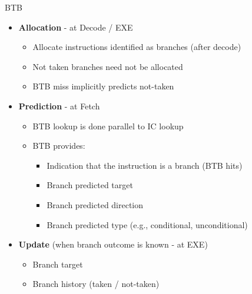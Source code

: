 \documentclass[aspectratio=169,12pt]{beamer}
\begin{document}
\begin{frame}{BTB}
    \begin{itemize}
        \item \textbf{Allocation} - at Decode / EXE
        \begin{itemize}
            \item Allocate instructions identified as branches (after decode)
            \item Not taken branches need not be allocated
            \item BTB miss implicitly predicts not-taken
        \end{itemize}
        \item \textbf{Prediction} - at Fetch
        \begin{itemize}
            \item BTB lookup is done parallel to IC lookup
            \item BTB provides:
            \begin{itemize}
                \item Indication that the instruction is a branch (BTB hits)
                \item Branch predicted target
                \item Branch predicted direction
                \item Branch predicted type (e.g., conditional, unconditional)
            \end{itemize}
        \end{itemize}
        \item \textbf{Update} (when branch outcome is known - at EXE)
        \begin{itemize}
            \item Branch target
            \item Branch history (taken / not-taken)
        \end{itemize}
    \end{itemize}
\end{frame}
\end{document}
